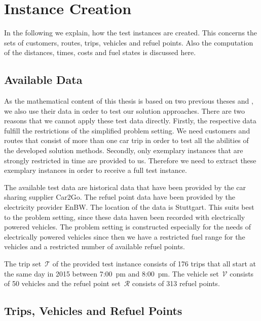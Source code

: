 \chapter{Instance Creation}
\label{ch:instance_creation}

In the following we explain, how the test instances are created. This concerns the sets of customers, routes, trips, vehicles and refuel points. Also the computation of the distances, times, costs and fuel states is discussed here. 

\section{Available Data}

As the mathematical content of this thesis is based on two previous theses \cite{Kaiser} and \cite{Knoll}, we also use their data in order to test our solution approaches. There are two reasons that we cannot apply these test data directly. Firstly, the respective data fulfill the restrictions of the simplified problem setting. We need customers and routes that consist of more than one car trip in order to test all the abilities of the developed solution methods. Secondly, only exemplary instances that are strongly restricted in time are provided to us. Therefore we need to extract these exemplary instances in order to receive a full test instance. 

The available test data are historical data that have been provided by the car sharing supplier Car2Go. The refuel point data have been provided by the electricity provider EnBW. The location of the data is Stuttgart. This suits best to the problem setting, since these data haven been recorded with electrically powered vehicles. The problem setting is constructed especially for the needs of electrically powered vehicles since then we have a restricted fuel range for the vehicles and a restricted number of available refuel points.

The trip set~$\mathcal{T}$ of the provided test instance consists of 176 trips that all start at the same day in 2015 between 7:00~pm and 8:00~pm. The vehicle set~$\mathcal{V}$ consists of 50 vehicles and the refuel point set~$\mathcal{R}$ consists of 313 refuel points.

\section{Trips, Vehicles and Refuel Points}
\label{sec:trip_creation}

